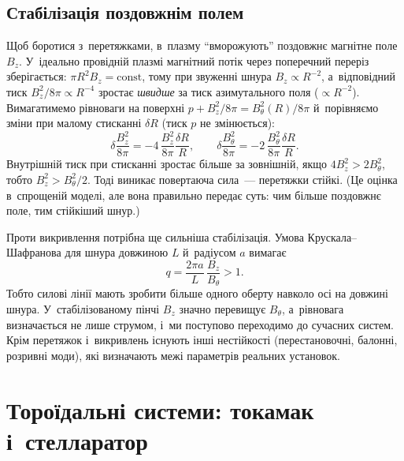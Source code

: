 \subsection{Стабілізація поздовжнім полем}



Щоб боротися з~перетяжками, в~плазму \enquote{вморожують} поздовжнє магнітне поле $B_z$.
У~ідеально провідній плазмі магнітний потік через поперечний переріз зберігається: $\pi
R^2B_z=\mathrm{const}$, тому при звуженні шнура $B_z\propto R^{-2}$, а~відповідний тиск
$B_z^2/8\pi\propto R^{-4}$ зростає \emph{швидше} за тиск азимутального поля ($\propto
R^{-2}$). Вимагатимемо рівноваги на поверхні $p+B_z^2/8\pi=B_\theta^2(R)/8\pi$
й~порівняємо зміни при малому стисканні $\delta R$ (тиск $p$ не змінюється):
\begin{equation*}
	\delta\frac{B_z^2}{8\pi}=-4\,\frac{B_z^2}{8\pi}\frac{\delta R}R,\qquad
	\delta\frac{B_\theta^2}{8\pi}=-2\,\frac{B_\theta^2}{8\pi}\frac{\delta R}R.
\end{equation*}
Внутрішній тиск при стисканні зростає більше за зовнішній, якщо $4B_z^2>2B_\theta^2$,
тобто $B_z^2>B_\theta^2/2$. Тоді виникає повертаюча сила~--- перетяжки стійкі. (Це оцінка
в~спрощеній моделі, але вона правильно передає суть: чим більше поздовжнє поле, тим
стійкіший шнур.)

Проти викривлення потрібна ще сильніша стабілізація. Умова Крускала--Шафранова для
шнура довжиною $L$ й~радіусом $a$ вимагає
\begin{equation*}
	q=\frac{2\pi a}L\,\frac{B_z}{B_\theta}>1.
\end{equation*}
Тобто силові лінії мають зробити більше одного оберту навколо осі на довжині шнура.
У~стабілізованому пінчі $B_z$ значно перевищує $B_\theta$, а~рівновага визначається не
лише струмом, і~ми поступово переходимо до сучасних систем. Крім перетяжок і~викривлень
існують інші нестійкості (перестановочні, балонні, розривні моди), які визначають межі
параметрів реальних установок.



\section{Тороїдальні системи: токамак і~стелларатор}



